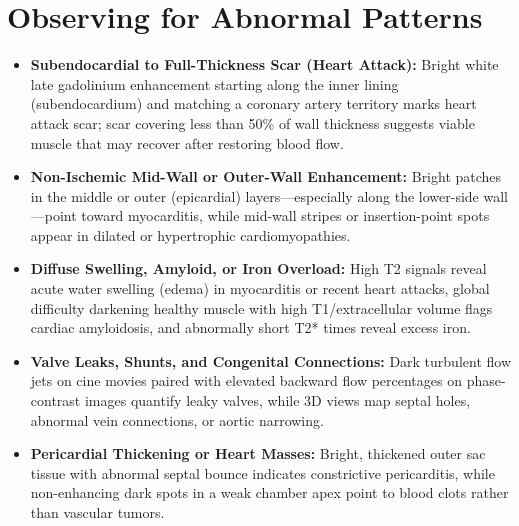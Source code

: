\section{Observing for Abnormal Patterns}
\begin{itemize}
\item \textbf{Subendocardial to Full-Thickness Scar (Heart Attack):} Bright white late gadolinium enhancement starting along the inner lining (subendocardium) and matching a coronary artery territory marks heart attack scar; scar covering less than 50\% of wall thickness suggests viable muscle that may recover after restoring blood flow.
\item \textbf{Non-Ischemic Mid-Wall or Outer-Wall Enhancement:} Bright patches in the middle or outer (epicardial) layers---especially along the lower-side wall---point toward myocarditis, while mid-wall stripes or insertion-point spots appear in dilated or hypertrophic cardiomyopathies.
\item \textbf{Diffuse Swelling, Amyloid, or Iron Overload:} High T2 signals reveal acute water swelling (edema) in myocarditis or recent heart attacks, global difficulty darkening healthy muscle with high T1/extracellular volume flags cardiac amyloidosis, and abnormally short T2* times reveal excess iron.
\item \textbf{Valve Leaks, Shunts, and Congenital Connections:} Dark turbulent flow jets on cine movies paired with elevated backward flow percentages on phase-contrast images quantify leaky valves, while 3D views map septal holes, abnormal vein connections, or aortic narrowing.
\item \textbf{Pericardial Thickening or Heart Masses:} Bright, thickened outer sac tissue with abnormal septal bounce indicates constrictive pericarditis, while non-enhancing dark spots in a weak chamber apex point to blood clots rather than vascular tumors.
\end{itemize}

